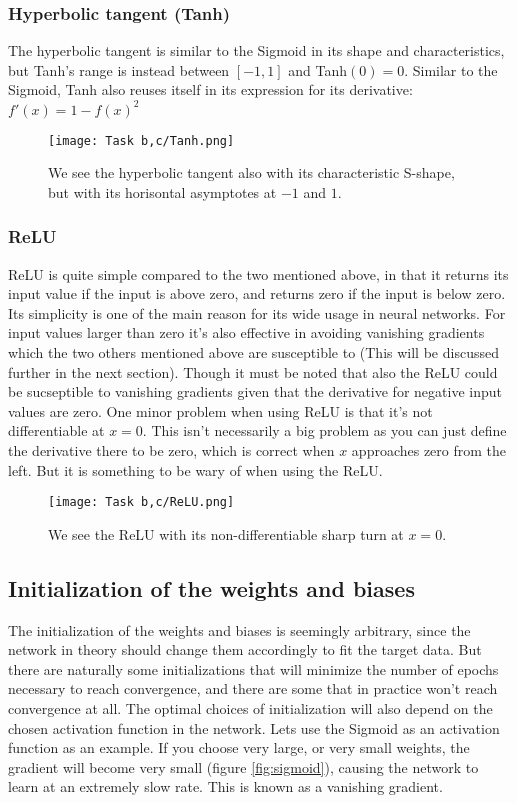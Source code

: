 \documentclass[a4paper, UKenglish, 11pt]{uiomaster}
\begin{document}
\subsubsection*{Hyperbolic tangent (Tanh)}
The hyperbolic tangent is similar to the Sigmoid in its shape and characteristics, but Tanh's range is instead between $[-1, 1]$ and Tanh$(0)=0$. Similar to the Sigmoid, Tanh also reuses itself in its expression for its derivative: $f'(x)=1-f(x)^2$

\begin{figure}[H]
    \centering
    \texttt{[image: Task b,c/Tanh.png]}
    \caption{We see the hyperbolic tangent also with its characteristic S-shape, but with its horisontal asymptotes at $-1$ and $1$.}
    \label{fig:Tanh}
\end{figure}

\subsubsection*{ReLU}
ReLU is quite simple compared to the two mentioned above, in that it returns its input value if the input is above zero, and returns zero if the input is below zero. Its simplicity is one of the main reason for its wide usage in neural networks. For input values larger than zero it's also effective in avoiding vanishing gradients which the two others mentioned above are susceptible to (This will be discussed further in the next section). Though it must be noted that also the ReLU could be sucseptible to vanishing gradients given that the derivative for negative input values are zero. One minor problem when using ReLU is that it's not differentiable at $x=0$. This isn't necessarily a big problem as you can just define the derivative there to be zero, which is correct when $x$ approaches zero from the left. But it is something to be wary of when using the ReLU.

\begin{figure}[H]
    \centering
    \texttt{[image: Task b,c/ReLU.png]}
    \caption{We see the ReLU with its non-differentiable sharp turn at $x=0$.}
    \label{fig:ReLU}
\end{figure}

\subsection*{Initialization of the weights and biases}

The initialization of the weights and biases is seemingly arbitrary, since the network in theory should change them accordingly to fit the target data. But there are naturally some initializations that will minimize the number of epochs necessary to reach convergence, and there are some that in practice won't reach convergence at all. The optimal choices of initialization will also depend on the chosen activation function in the network. Lets use the Sigmoid as an activation function as an example. If you choose very large, or very small weights, the gradient will become very small (figure \ref{fig:sigmoid}), causing the network to learn at an extremely slow rate. This is known as a vanishing gradient.
\end{document}
